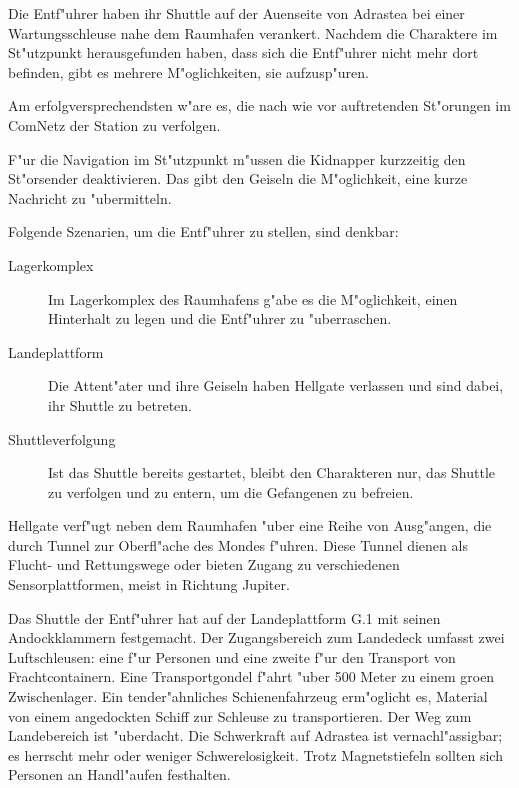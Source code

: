 Die Entf"uhrer haben ihr Shuttle auf der Au\3enseite von Adrastea bei einer Wartungsschleuse nahe dem Raumhafen verankert. Nachdem die Charaktere im St"utzpunkt herausgefunden haben, dass sich die Entf"uhrer nicht mehr dort befinden, gibt es mehrere M"oglichkeiten, sie aufzusp"uren.

Am erfolgversprechendsten w"are es, die nach wie vor auftretenden St"orungen im ComNetz der Station zu verfolgen.

F"ur die Navigation im St"utzpunkt m"ussen die Kidnapper kurzzeitig den St"orsender deaktivieren. Das gibt den Geiseln die M"oglichkeit, eine kurze Nachricht zu "ubermitteln.

Folgende Szenarien, um die Entf"uhrer zu stellen, sind denkbar:

\begin{description}
	\item [Lagerkomplex] Im Lagerkomplex des Raumhafens g"abe es die M"oglichkeit, einen Hinterhalt zu legen und die Entf"uhrer zu 
		"uberraschen. 
	\item [Landeplattform] Die Attent"ater und ihre Geiseln haben Hellgate verlassen und sind dabei, ihr Shuttle zu betreten.
	\item [Shuttleverfolgung] Ist das Shuttle bereits gestartet, bleibt den Charakteren nur, das Shuttle zu verfolgen und zu entern, um die 
		Gefangenen zu befreien.
\end{description}



Hellgate verf"ugt neben dem Raumhafen "uber eine Reihe von Ausg"angen, die durch Tunnel zur Oberfl"ache des Mondes f"uhren. Diese Tunnel dienen als Flucht- und Rettungswege oder bieten Zugang zu verschiedenen Sensorplattformen, meist in Richtung Jupiter.

Das Shuttle der Entf"uhrer hat auf der Landeplattform G.1 mit seinen Andockklammern festgemacht. Der Zugangsbereich zum Landedeck umfasst zwei Luftschleusen: eine f"ur Personen und eine zweite f"ur den Transport von Frachtcontainern. Eine Transportgondel f"ahrt "uber 500 Meter zu einem gro\3en Zwischenlager. Ein tender"ahnliches Schienenfahrzeug erm"oglicht es, Material von einem angedockten Schiff zur Schleuse zu transportieren. Der Weg zum Landebereich ist "uberdacht. Die Schwerkraft auf Adrastea ist vernachl"assigbar; es herrscht mehr oder weniger Schwerelosigkeit. Trotz Magnetstiefeln sollten sich Personen an Handl"aufen festhalten.


